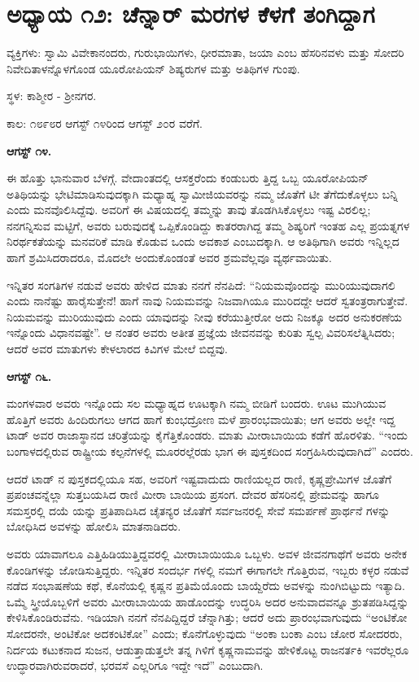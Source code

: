 
\chapter{ಅಧ್ಯಾಯ ೧೨: ಚೆನ್ನಾರ್ ಮರಗಳ ಕೆಳಗೆ ತಂಗಿದ್ದಾಗ}

ವ್ಯಕ್ತಿಗಳು: ಸ್ವಾಮಿ ವಿವೇಕಾನಂದರು, ಗುರುಭಾಯಿಗಳು, ಧೀರಮಾತಾ, ಜಯಾ ಎಂಬ ಹೆಸರಿನವಳು ಮತ್ತು ಸೋದರಿ ನಿವೇದಿತಾಳನ್ನೊಳಗೊಂಡ ಯೂರೋಪಿಯನ್ ಶಿಷ್ಯರುಗಳ ಮತ್ತು ಅತಿಥಿಗಳ ಗುಂಪು.

ಸ್ಥಳ: ಕಾಶ್ಮೀರ - ಶ‍್ರೀನಗರ.

ಕಾಲ: ೧೮೯೮ರ ಆಗಸ್ಟ್ ೧೪ರಿಂದ ಆಗಸ್ಟ್ ೨೦ರ ವರೆಗೆ.

\textbf{ಆಗಸ್ಟ್ ೧೪.}

ಈ ಹೊತ್ತು ಭಾನುವಾರ ಬೆಳಗ್ಗೆ. ವೇದಾಂತದಲ್ಲಿ ಆಸಕ್ತರೆಂದು ಕಂಡುಬರು ತ್ತಿದ್ದ ಒಬ್ಬ ಯೂರೋಪಿಯನ್ ಅತಿಥಿಯನ್ನು ಭೇಟಿಮಾಡಿಸುವುದಕ್ಕಾಗಿ ಮಧ್ಯಾಹ್ನ ಸ್ವಾಮೀಜಿಯವರನ್ನು ನಮ್ಮ ಜೊತೆಗೆ ಟೀ ತೆಗೆದುಕೊಳ್ಳಲು ಬನ್ನಿ ಎಂದು ಮನವೊಲಿಸಿದ್ದೆವು. ಅವರಿಗೆ ಈ ವಿಷಯದಲ್ಲಿ ತಮ್ಮನ್ನು ತಾವು ತೊಡಗಿಸಿಕೊಳ್ಳಲು ಇಷ್ಟ ವಿರಲಿಲ್ಲ; ನನಗನ್ನಿಸುವ ಮಟ್ಟಿಗೆ, ಅವರು ಬರುವುದಕ್ಕೆ ಒಪ್ಪಿಕೊಂಡಿದ್ದು ಕಾತರರಾಗಿದ್ದ ತಮ್ಮ ಶಿಷ್ಯರಿಗೆ ಇಂತಹ ಎಲ್ಲ ಪ್ರಯತ್ನಗಳ ನಿರರ್ಥಕತೆಯನ್ನು ಮನವರಿಕೆ ಮಾಡಿ ಕೊಡುವ ಒಂದು ಅವಕಾಶ ಎಂಬುದಕ್ಕಾಗಿ. ಆ ಅತಿಥಿಗಾಗಿ ಅವರು ಇನ್ನಿಲ್ಲದ ಹಾಗೆ ಶ್ರಮಿಸಿದರಾದರೂ, ಮೊದಲೇ ಅಂದುಕೊಂಡಂತೆ ಅವರ ಶ್ರಮವೆಲ್ಲವೂ ವ್ಯರ್ಥವಾಯಿತು.

ಇನ್ನಿತರ ಸಂಗತಿಗಳ ನಡುವೆ ಅವರು ಹೇಳಿದ ಮಾತು ನನಗೆ ನೆನಪಿದೆ: “ನಿಯಮವೊಂದನ್ನು ಮುರಿಯುವುದಾಗಲಿ ಎಂದು ನಾನೆಷ್ಟು ಹಾರೈಸುತ್ತೇನೆ! ಹಾಗೆ ನಾವು ನಿಯಮವನ್ನು ನಿಜವಾಗಿಯೂ ಮುರಿದದ್ದೇ ಆದರೆ ಸ್ವತಂತ್ರರಾಗುತ್ತೇವೆ. ನಿಯಮವನ್ನು ಮುರಿಯುವುದು ಎಂದು ಯಾವುದನ್ನು ನೀವು ಕರೆಯುತ್ತೀರೋ ಅದು ನಿಜಕ್ಕೂ ಅದರ ಅನುಕರಣೆಯ ಇನ್ನೊಂದು ವಿಧಾನವಷ್ಟೇ”. ಆ ನಂತರ ಅವರು ಅತೀತ ಪ್ರಜ್ಞೆಯ ಜೀವನವನ್ನು ಕುರಿತು ಸ್ವಲ್ಪ ವಿವರಿಸಲೆತ್ನಿಸಿದರು; ಆದರೆ ಅವರ ಮಾತುಗಳು ಕೇಳಲಾರದ ಕಿವಿಗಳ ಮೇಲೆ ಬಿದ್ದವು.

\textbf{ಆಗಸ್ಟ್ ೧೬.}

ಮಂಗಳವಾರ ಅವರು ಇನ್ನೊಂದು ಸಲ ಮಧ್ಯಾಹ್ನದ ಊಟಕ್ಕಾಗಿ ನಮ್ಮ ಬೀಡಿಗೆ ಬಂದರು. ಊಟ ಮುಗಿಯುವ ಹೊತ್ತಿಗೆ ಅವರು ಹಿಂದಿರುಗಲು ಆಗದ ಹಾಗೆ ಕುಂಭದ್ರೋಣ ಮಳೆ ಪ್ರಾರಂಭವಾಯಿತು; ಆಗ ಅವರು ಅಲ್ಲೇ ಇದ್ದ ಟಾಡ್ ಅವರ ರಾಜಾಸ್ಥಾನದ ಚರಿತ್ರೆಯನ್ನು ಕೈಗೆತ್ತಿಕೊಂಡರು. ಮಾತು ಮೀರಾಬಾಯಿಯ ಕಡೆಗೆ ಹೊರಳಿತು. “ಇಂದು ಬಂಗಾಳದಲ್ಲಿರುವ ರಾಷ್ಟ್ರೀಯ ಕಲ್ಪನೆಗಳಲ್ಲಿ ಮೂರರಲ್ಲೆರಡು ಭಾಗ ಈ ಪುಸ್ತಕದಿಂದ ಸಂಗ್ರಹಿಸಿರುವುದಾಗಿದೆ” ಎಂದರು.

ಆದರೆ ಟಾಡ್ ನ ಪುಸ್ತಕದಲ್ಲಿಯೂ ಸಹ, ಅವರಿಗೆ ಇಷ್ಟವಾದುದು ರಾಣಿಯಲ್ಲದ ರಾಣಿ, ಕೃಷ್ಣಪ್ರೇಮಿಗಳ ಜೊತೆಗೆ ಪ್ರಪಂಚವನ್ನೆಲ್ಲಾ ಸುತ್ತಬಯಸಿದ ರಾಣಿ ಮೀರಾ ಬಾಯಿಯ ಪ್ರಸಂಗ. ದೇವರ ಹೆಸರಿನಲ್ಲಿ ಪ್ರೇಮವನ್ನು ಹಾಗೂ ಸಮಸ್ತರಲ್ಲಿ ದಯೆ ಯನ್ನು ಪ್ರತಿಪಾದಿಸಿದ ಚೈತನ್ಯರ ಜೊತೆಗೆ ಸರ್ವಜನರಲ್ಲಿ ಸೇವೆ ಸಮರ್ಪಣೆ ಪ್ರಾರ್ಥನೆ ಗಳನ್ನು ಬೋಧಿಸಿದ ಅವಳನ್ನು ಹೋಲಿಸಿ ಮಾತನಾಡಿದರು.

ಅವರು ಯಾವಾಗಲೂ ಎತ್ತಿಹಿಡಿಯುತ್ತಿದ್ದವರಲ್ಲಿ ಮೀರಾಬಾಯಿಯೂ ಒಬ್ಬಳು. ಅವಳ ಜೀವನಗಾಥೆಗೆ ಅವರು ಅನೇಕ ಕೊಂಡಿಗಳನ್ನು ಜೋಡಿಸುತ್ತಿದ್ದರು. ಇನ್ನಿತರ ಸಂದರ್ಭ ಗಳಲ್ಲಿ ನಮಗೆ ಈಗಾಗಲೇ ಗೊತ್ತಿರುವ, ಇಬ್ಬರು ಕಳ್ಳರ ನಡುವೆ ನಡೆದ ಸಂಭಾಷಣೆಯ ಕಥೆ, ಕೊನೆಯಲ್ಲಿ ಕೃಷ್ಣನ ಪ್ರತಿಮೆಯೊಂದು ಬಾಯ್ದೆರೆದು ಅವಳನ್ನು ನುಂಗಿಬಿಟ್ಟುದು ಇತ್ಯಾದಿ. ಒಮ್ಮೆ ಸ್ತ್ರೀಯೊಬ್ಬಳಿಗೆ ಅವರು ಮೀರಾಬಾಯಿಯ ಹಾಡೊಂದನ್ನು ಉದ್ಧರಿಸಿ ಅದರ ಅನುವಾದವನ್ನೂ ಶ್ರುತಪಡಿಸಿದ್ದನ್ನು ಕೇಳಿಸಿಕೊಂಡಿರುವೆನು. ಇಡಿಯಾಗಿ ನನಗೆ ನೆನಪಿದ್ದಿದ್ದರೆ ಚೆನ್ನಾಗಿತ್ತು; ಆದರೆ ಅದು ಪ್ರಾರಂಭವಾಗುವುದು “ಅಂಟಿಕೋ ಸೋದರನೇ, ಅಂಟಿಕೋ ಅದಕಂಟಿಕೋ” ಎಂದು; ಕೊನೆಗೊಳ್ಳುವುದು “ಅಂಕಾ ಬಂಕಾ ಎಂಬ ಚೋರ ಸೋದರರು, ನಿರ್ದಯ ಕಟುಕನಾದ ಸುಜನ, ಆಡುತ್ತಾಡುತ್ತಲೇ ತನ್ನ ಗಿಳಿಗೆ ಕೃಷ್ಣನಾಮವನ್ನು ಹೇಳಿಕೊಟ್ಟ ರಾಜನರ್ತಕಿ ಇವರೆಲ್ಲರೂ ಉದ್ಧಾರವಾಗಿರುವರಾದರೆ, ಭರವಸೆ ಎಲ್ಲರಿಗೂ ಇದ್ದೇ ಇದೆ” ಎಂಬುದಾಗಿ.

